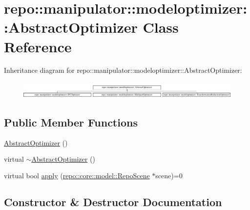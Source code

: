 \hypertarget{classrepo_1_1manipulator_1_1modeloptimizer_1_1_abstract_optimizer}{}\section{repo\+:\+:manipulator\+:\+:modeloptimizer\+:\+:Abstract\+Optimizer Class Reference}
\label{classrepo_1_1manipulator_1_1modeloptimizer_1_1_abstract_optimizer}
Inheritance diagram for repo\+:\+:manipulator\+:\+:modeloptimizer\+:\+:Abstract\+Optimizer\+:\begin{figure}[H]
\begin{center}
\leavevmode
\includegraphics[height=0.921811cm]{classrepo_1_1manipulator_1_1modeloptimizer_1_1_abstract_optimizer}
\end{center}
\end{figure}
\subsection*{Public Member Functions}
\begin{DoxyCompactItemize}
\item 
\hyperlink{classrepo_1_1manipulator_1_1modeloptimizer_1_1_abstract_optimizer_a9a592c40d89082c63a4e602fed426469}{Abstract\+Optimizer} ()
\item 
virtual \hyperlink{classrepo_1_1manipulator_1_1modeloptimizer_1_1_abstract_optimizer_ab86ed975e5691c531e5ef528379ec60b}{$\sim$\+Abstract\+Optimizer} ()
\item 
virtual bool \hyperlink{classrepo_1_1manipulator_1_1modeloptimizer_1_1_abstract_optimizer_a38e98344c1d3c66fbea8adae41dc6cb1}{apply} (\hyperlink{classrepo_1_1core_1_1model_1_1_repo_scene}{repo\+::core\+::model\+::\+Repo\+Scene} $\ast$scene)=0
\end{DoxyCompactItemize}


\subsection{Constructor \& Destructor Documentation}
\hypertarget{classrepo_1_1manipulator_1_1modeloptimizer_1_1_abstract_optimizer_a9a592c40d89082c63a4e602fed426469}{}
